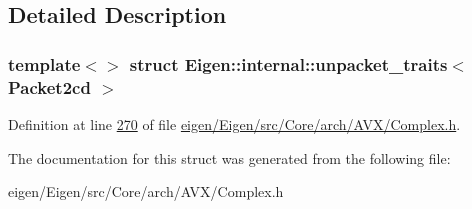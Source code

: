 \subsection{Detailed Description}
\subsubsection*{template$<$$>$\newline
struct Eigen\+::internal\+::unpacket\+\_\+traits$<$ Packet2cd $>$}



Definition at line \hyperlink{eigen_2_eigen_2src_2_core_2arch_2_a_v_x_2_complex_8h_source_l00270}{270} of file \hyperlink{eigen_2_eigen_2src_2_core_2arch_2_a_v_x_2_complex_8h_source}{eigen/\+Eigen/src/\+Core/arch/\+A\+V\+X/\+Complex.\+h}.



The documentation for this struct was generated from the following file\+:\begin{DoxyCompactItemize}
\item 
eigen/\+Eigen/src/\+Core/arch/\+A\+V\+X/\+Complex.\+h\end{DoxyCompactItemize}
